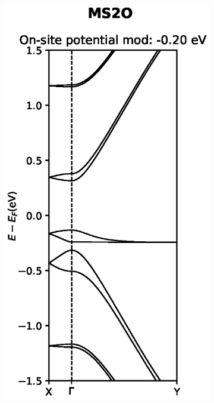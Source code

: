 \begin{figure}[h]
\begin{subfigure}[b]{0.3\textwidth}
		\vspace{-2.5\baselineskip}
		\caption{}
		\label{MS2Odevnomod}
	\end{subfigure}
	~
	\begin{subfigure}[b]{0.3\textwidth}
		\centering
		\includegraphics[width=\textwidth]{Figures/MS2Omod.eps}
		\vspace{-2.5\baselineskip}

\end{subfigure}
\end{figure}
